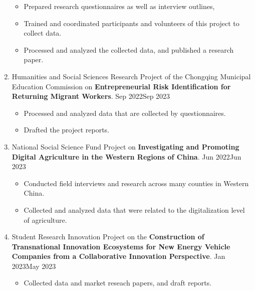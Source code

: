 \documentclass[a4paper,20pt]{article}
\begin{document}
\begin{enumerate}
        \begin{itemize}
            \item Prepared research questionnaires as well as interview outlines,            \vspace{-5pt}
            \item Trained and coordinated participants and volunteers of this project to collect data.            \vspace{-5pt}
            \item Processed and analyzed the collected data, and published a research paper.            \vspace{-5pt}
        \end{itemize}
        \item Humanities and Social Sciences Research Project of the Chongqing Municipal Education Commission on \textbf{Entrepreneurial Risk Identification for Returning Migrant Workers}.
Sep 2022\textemdash Sep 2023
        \begin{itemize}
            \item Processed and analyzed data that are collected by questionnaires.            \vspace{-5pt}
            \item Drafted the project reports.
        \end{itemize}
        \item National Social Science Fund Project on \textbf{Investigating and Promoting Digital Agriculture in the Western Regions of China}. Jun 2022\textemdash Jun 2023
        \begin{itemize}
            \item Conducted field interviews and research across many counties in Western China.            \vspace{-5pt}
            \item Collected and analyzed data that were related to the digitalization level of agriculture.
        \end{itemize}
        \item Student Research Innovation Project on the \textbf{Construction of Transnational Innovation Ecosystems for New Energy Vehicle Companies from a Collaborative Innovation Perspective}. Jan 2023\textemdash May 2023
                \begin{itemize}
            \item Collected data and market reseach papers, and draft reports.
        \end{itemize}
    \end{enumerate}
\end{document}
